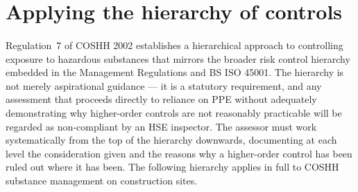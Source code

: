 \section{Applying the hierarchy of controls}

\paragraph{}
Regulation~7 of COSHH 2002 establishes a hierarchical approach to controlling exposure to hazardous substances that mirrors the broader risk control hierarchy embedded in the Management Regulations and BS ISO 45001. The hierarchy is not merely aspirational guidance — it is a statutory requirement, and any assessment that proceeds directly to reliance on PPE without adequately demonstrating why higher-order controls are not reasonably practicable will be regarded as non-compliant by an HSE inspector. The assessor must work systematically from the top of the hierarchy downwards, documenting at each level the consideration given and the reasons why a higher-order control has been ruled out where it has been. The following hierarchy applies in full to COSHH substance management on construction sites.

